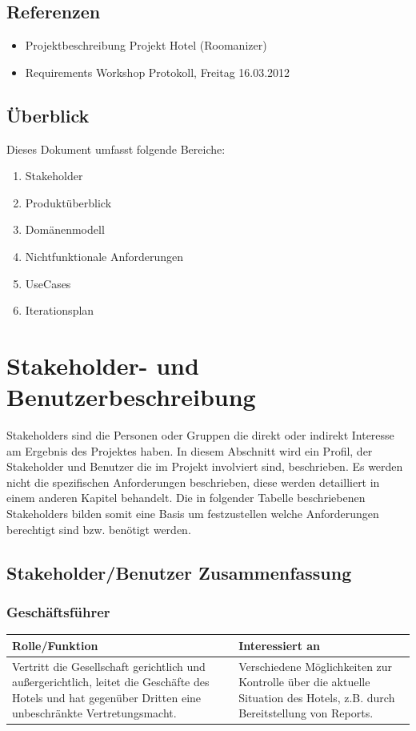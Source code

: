 \documentclass[10pt,a4paper,titlepage]{article}
\begin{document}
\subsection{Referenzen}
\begin{itemize}
	\item Projektbeschreibung Projekt Hotel (Roomanizer) 
	\item Requirements Workshop Protokoll, Freitag 16.03.2012
\end{itemize}
\subsection{Überblick}
Dieses Dokument umfasst folgende Bereiche:
\begin{enumerate}
	\item Stakeholder
        \item Produktüberblick
	\item Domänenmodell
        \item Nichtfunktionale Anforderungen
	\item UseCases
        \item Iterationsplan 
\end{enumerate}

\newpage

\section{Stakeholder- und Benutzerbeschreibung}
Stakeholders sind die Personen oder Gruppen die direkt oder indirekt Interesse am Ergebnis des Projektes haben. In diesem Abschnitt wird ein Profil, der Stakeholder und Benutzer die im Projekt involviert sind, beschrieben. Es werden nicht die spezifischen Anforderungen beschrieben, diese werden detailliert in einem anderen Kapitel behandelt. Die in folgender Tabelle beschriebenen Stakeholders bilden somit eine Basis um festzustellen welche Anforderungen berechtigt sind bzw. benötigt werden. 
\subsection{Stakeholder\slash{}Benutzer Zusammenfassung}
\subsubsection{Geschäftsführer}
\begin{tabular}[t]{|p{5cm}|p{5cm}|}
    \hline
    \textbf{Rolle\slash{}Funktion} & \textbf{Interessiert an} \\
    \hline
Vertritt die Gesellschaft gerichtlich und außergerichtlich, leitet die Geschäfte des Hotels und hat gegenüber Dritten eine unbeschränkte Vertretungsmacht. &
    Verschiedene Möglichkeiten zur Kontrolle über die aktuelle Situation des Hotels, z.B. durch Bereitstellung von \Glspl{Report}.\\
    \hline
\end{tabular}
\end{document}
